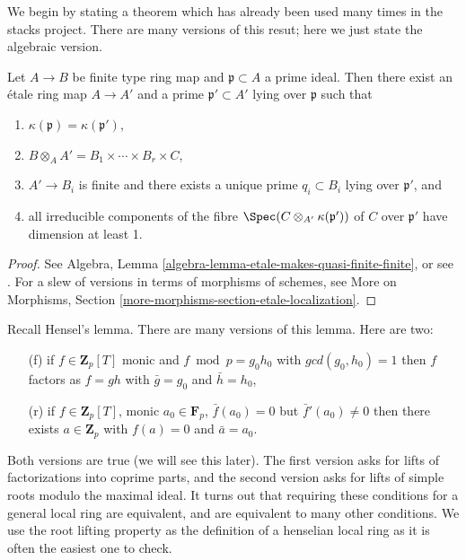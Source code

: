 \noindent
We begin by stating a theorem which has already been used many times
in the stacks project. There are many versions of this resut; here we
just state the algebraic version.

\begin{theorem}
\label{theorem-quasi-finite-etale-locally}
Let $A\to B$ be finite type ring map and $\mathfrak p \subset A$ a prime
ideal. Then there exist an \'etale ring map $A \to A'$ and a prime
$\mathfrak p' \subset A'$ lying over $\mathfrak p$ such that
\begin{enumerate}
\item
$\kappa(\mathfrak p) = \kappa(\mathfrak p')$,
\item
$ B \otimes_A A' = B_1\times \cdots \times B_r \times C$,
\item
$ A'\to B_i$ is finite and there exists a unique prime $q_i\subset B_i$ lying
over $\mathfrak p'$, and
\item all irreducible components of the fibre
$\Spec(C \otimes_{A'} \kappa(\mathfrak p'))$ of $C$ over $\mathfrak p'$
have dimension at least 1.
\end{enumerate}
\end{theorem}

\begin{proof}
See Algebra, Lemma \ref{algebra-lemma-etale-makes-quasi-finite-finite}, or
see \cite[Th\'eor\`eme 18.12.1]{EGA4}. For a slew of versions in terms of
morphisms of schemes, see
More on Morphisms, Section \ref{more-morphisms-section-etale-localization}.
\end{proof}

\noindent
Recall Hensel's lemma.
There are many versions of this lemma. Here are two:
\begin{enumerate}
\item[(f)] if $f\in \mathbf{Z}_p[T]$ monic and
$f \bmod p = g_0 h_0$ with $gcd(g_0, h_0) = 1$ then $f$ factors
as $f = gh$ with $\bar g = g_0$ and $\bar h = h_0$,
\item[(r)] if $f \in \mathbf{Z}_p[T]$, monic $a_0 \in \mathbf{F}_p$,
$\bar f(a_0) =0$ but $\bar f'(a_0) \neq 0$
then there exists $a \in \mathbf{Z}_p$ with
$f(a) = 0$ and $\bar a = a_0$.
\end{enumerate}
Both versions are true (we will see this later). The first version
asks for lifts of factorizations into coprime parts,
and the second version asks for lifts of simple roots
modulo the maximal ideal. It turns out that requiring
these conditions for a general local ring are equivalent, and are
equivalent to many other conditions. We use the root lifting
property as the definition of a henselian local ring as it is
often the easiest one to check.

